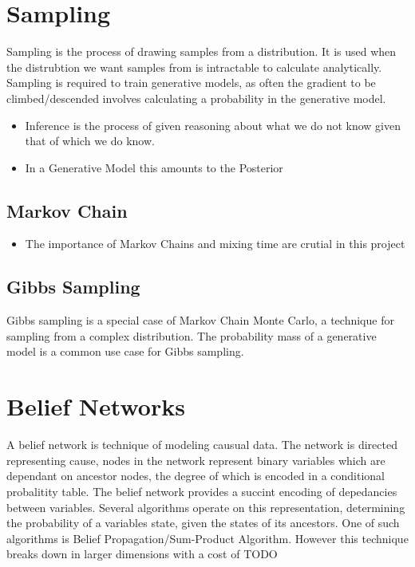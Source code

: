 \section{Sampling}

Sampling is the process of drawing samples from a distribution. It is used when the distrubtion we want samples from is intractable to calculate
analytically. Sampling is required to train generative models, as often the gradient to be climbed/descended involves calculating a probability in the
generative model.

\begin{itemize}
  \item Inference is the process of given reasoning about what we do not know given that of which we do know.
  \item In a Generative Model this amounts to the Posterior
\end{itemize}

  \subsection{Markov Chain}

  \begin{itemize}
    \item The importance of Markov Chains and mixing time are crutial in this project
  \end{itemize}


  \subsection{Gibbs Sampling}

  Gibbs sampling is a special case of Markov Chain Monte Carlo, a technique for sampling from a complex distribution. The probability mass of a generative model is a common use case for Gibbs sampling.



\section{Belief Networks}

A belief network is technique of modeling causual data. The network is directed representing cause, nodes in the network represent binary variables which are dependant on ancestor nodes, the degree of which is encoded in a conditional probalitity table. The belief network provides a succint encoding of depedancies between variables. Several algorithms operate on this representation, determining the probability of a variables state, given the states of its ancestors. One of such algorithms is Belief Propagation/Sum-Product Algorithm. However this technique breaks down in larger dimensions with a cost of TODO


